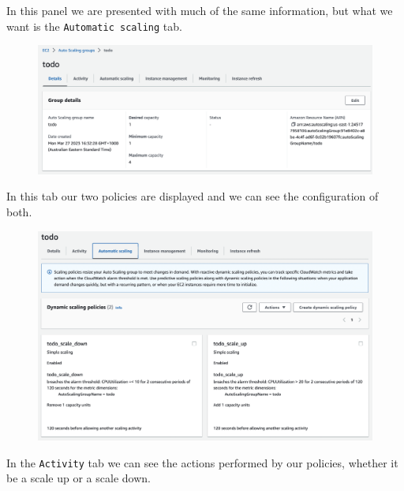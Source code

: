 \documentclass{csse4400}
\begin{document}
In this panel we are presented with much of the same information, but what we want is the \texttt{Automatic scaling} tab.

\begin{figure}[H]
  \begin{center}
    \includegraphics[width=\textwidth]{images/ec2_4}
  \end{center}
\end{figure}

In this tab our two policies are displayed and we can see the configuration of both.

\begin{figure}[H]
  \begin{center}
    \includegraphics[width=\textwidth]{images/ec2_5}
  \end{center}
\end{figure}

In the \texttt{Activity} tab we can see the actions performed by our policies, whether it be a scale up or a scale down.
\end{document}
